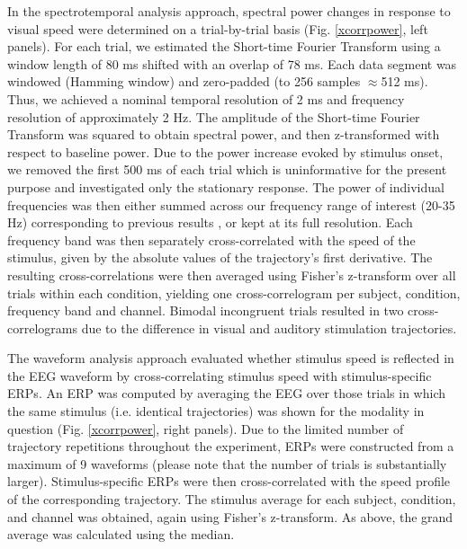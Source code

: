In the spectrotemporal analysis approach, spectral power changes in
response to visual speed were determined on a trial-by-trial basis (Fig.
\ref{xcorrpower}, left panels). For each trial, we estimated the Short-time
Fourier Transform using a window length of 80 ms shifted with an overlap of
78 ms. Each data segment was windowed (Hamming window) and zero-padded (to
256 samples $\approx$512 ms). Thus, we achieved a nominal temporal
resolution of 2 ms and frequency resolution of approximately 2 Hz. The
amplitude of the Short-time Fourier Transform was squared to obtain
spectral power, and then z-transformed with respect to baseline power. Due
to the power increase evoked by stimulus onset, we removed the first 500 ms
of each trial which is uninformative for the present purpose and
investigated only the stationary response. The power of individual
frequencies was then either summed across our frequency range of interest
(20-35 Hz) corresponding to previous results \citep{kayser2004b}, or kept
at its full resolution. Each frequency band was then separately
cross-correlated with the speed of the stimulus, given by the absolute
values of the trajectory's first derivative. The resulting
cross-correlations were then averaged using Fisher's z-transform over all
trials within each condition, yielding one cross-correlogram per subject,
condition, frequency band and channel. Bimodal incongruent trials resulted
in two cross-correlograms due to the difference in visual and auditory
stimulation trajectories. 



The waveform analysis approach evaluated whether stimulus speed is
reflected in the EEG waveform by cross-correlating stimulus speed with
stimulus-specific ERPs. An ERP was computed by averaging the EEG over those
trials in which the same stimulus (i.e. identical trajectories) was shown
for the modality in question (Fig. \ref{xcorrpower}, right panels). Due to the
limited number of trajectory repetitions throughout the experiment, ERPs
were constructed from a maximum of 9 waveforms (please note that the number
of trials is substantially larger). Stimulus-specific ERPs were then
cross-correlated with the speed profile of the corresponding trajectory.
The stimulus average for each subject, condition, and channel was obtained,
again using Fisher's z-transform. As above, the grand average was
calculated using the median.



